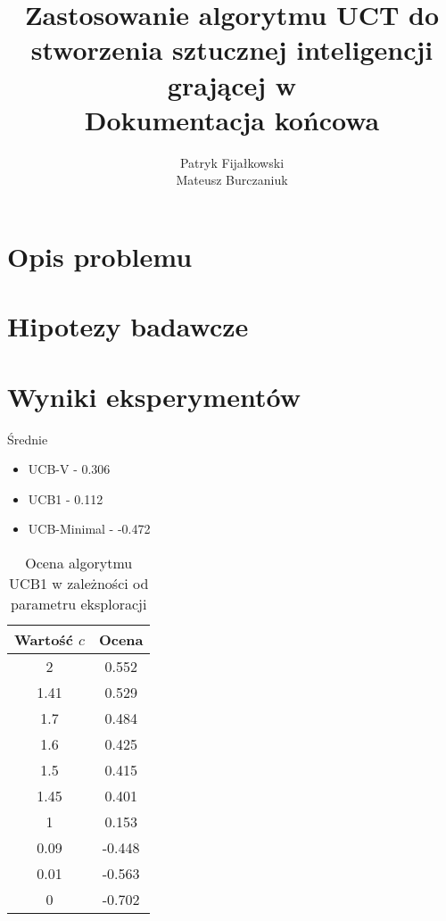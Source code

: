 \documentclass[a4paper,12pt]{article}
\title{
	Zastosowanie algorytmu UCT do stworzenia sztucznej inteligencji grającej w \nazwagry\\
	\large Dokumentacja końcowa}
\author{Patryk Fijałkowski \\ Mateusz Burczaniuk}
\let\oldsection\section
\renewcommand\section{\clearpage\oldsection}
\begin{document}
\begin{titlingpage}
	\maketitle
	\vspace{3cm}
\end{titlingpage}

\section{Opis problemu}
\section{Hipotezy badawcze}
\section{Wyniki eksperymentów}

Średnie
\begin{itemize}
	\item UCB-V - 0.306
	\item UCB1 - 0.112
	\item UCB-Minimal - -0.472
\end{itemize}

\begin{table}[!h]
\centering
\begin{tabular}{|c|c|} \hline
	Wartość $c$ & Ocena \\ \hline
	2 &	0.552 \\ \hline
	1.41 &	0.529 \\ \hline
	1.7 &	0.484 \\ \hline
	1.6 &	0.425 \\ \hline
	1.5 &	0.415 \\ \hline
	1.45 &	0.401 \\ \hline
	1 &	0.153 \\ \hline
	0.09 &	-0.448 \\ \hline
	0.01 &	-0.563 \\ \hline
	0 & -0.702 \\ \hline
\end{tabular}
\caption{Ocena algorytmu UCB1 w zależności od parametru eksploracji}
\label{tab:ucb1_param}
\end{table}
\end{document}

